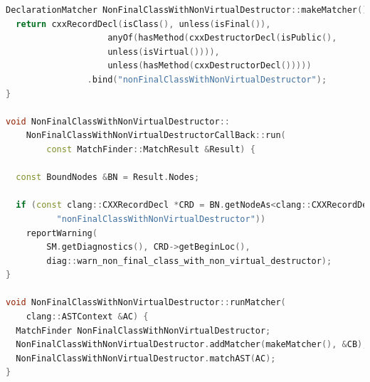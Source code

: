 \documentclass[12pt,oneside]{memoir}
\begin{document}
\begin{lstlisting}[style=customc, caption={Primer upariv\v{c}a koji pronalazi sve klase koje nisu obeležene atributom \texttt{final} i čiji destruktor nije virtuelan, CallBack klase i poziva upariva\v{c}a}, label=lst:label7,language=C++, captionpos=b]
DeclarationMatcher NonFinalClassWithNonVirtualDestructor::makeMatcher() {
  return cxxRecordDecl(isClass(), unless(isFinal()),
                    anyOf(hasMethod(cxxDestructorDecl(isPublic(),
                    unless(isVirtual()))),
                    unless(hasMethod(cxxDestructorDecl()))))
                .bind("nonFinalClassWithNonVirtualDestructor");
}

void NonFinalClassWithNonVirtualDestructor::
    NonFinalClassWithNonVirtualDestructorCallBack::run(
        const MatchFinder::MatchResult &Result) {

  const BoundNodes &BN = Result.Nodes;
  
  if (const clang::CXXRecordDecl *CRD = BN.getNodeAs<clang::CXXRecordDecl>(
          "nonFinalClassWithNonVirtualDestructor"))
    reportWarning(
        SM.getDiagnostics(), CRD->getBeginLoc(),
        diag::warn_non_final_class_with_non_virtual_destructor);
}

void NonFinalClassWithNonVirtualDestructor::runMatcher(
    clang::ASTContext &AC) {
  MatchFinder NonFinalClassWithNonVirtualDestructor;
  NonFinalClassWithNonVirtualDestructor.addMatcher(makeMatcher(), &CB);
  NonFinalClassWithNonVirtualDestructor.matchAST(AC);
}
\end{lstlisting}
\end{document}
